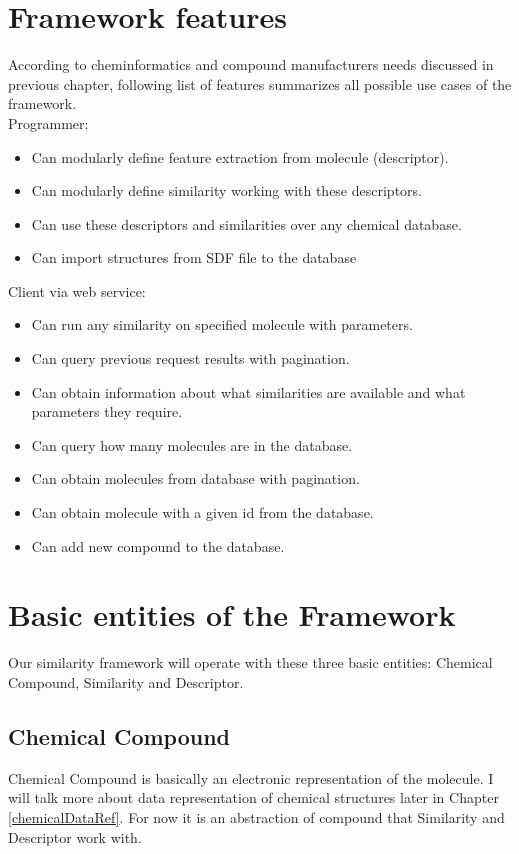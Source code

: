 \documentclass[thesis=M,english]{FITthesis}[2012/10/20]
\begin{document}
\section{Framework features}
According to cheminformatics and compound manufacturers needs discussed in previous chapter, following list of features summarizes all possible use cases of the framework.\\
Programmer:
\begin{itemize}
\item Can modularly define feature extraction from molecule (descriptor).
\item Can modularly define similarity working with these descriptors.
\item Can use these descriptors and similarities over any chemical database.
\item Can import structures from SDF file to the database
\end{itemize}
Client via web service:
\begin{itemize}
\item Can run any similarity on specified molecule with parameters.
\item Can query previous request results with pagination.
\item Can obtain information about what similarities are available and what parameters they require.
\item Can query how many molecules are in the database.
\item Can obtain molecules from database with pagination.
\item Can obtain molecule with a given id from the database.
\item Can add new compound to the database.
\end{itemize}


\section{Basic entities of the Framework}
Our similarity framework will operate with these three basic entities: Chemical Compound, Similarity and Descriptor.

\subsection{Chemical Compound}
Chemical Compound is basically an electronic representation of the molecule. I will talk more about data representation of chemical structures later in Chapter \ref{chemicalDataRef}. For now it is an abstraction of compound that Similarity and Descriptor work with. 
\end{document}
